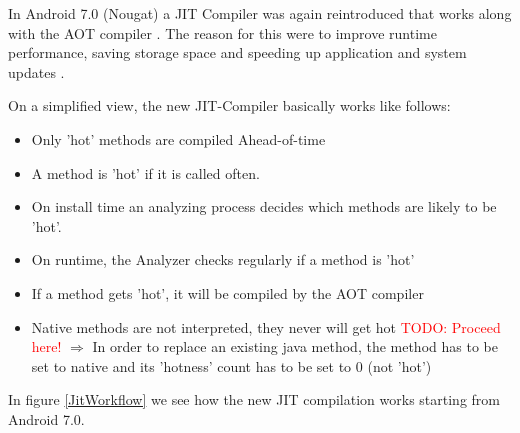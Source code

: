 In Android 7.0 (Nougat) a JIT Compiler was again reintroduced that works along with the AOT compiler \cite{Android7ForDevelopers}. The reason for this were to improve runtime performance, saving storage space and speeding up application and system updates \cite{JitWorkFlow}.

On a simplified view, the new JIT-Compiler basically works like follows:  


\begin{itemize}
    \item Only 'hot' methods are compiled Ahead-of-time 
    \item A method is 'hot' if it is called often.
    \item On install time an analyzing process decides which methods are likely to be 'hot'.
    \item On runtime, the Analyzer checks regularly if a method is 'hot'
    \item If a method gets 'hot', it will be compiled by the AOT compiler
    \item Native methods are not interpreted, they never will get hot \newline
    \textcolor{red}{TODO: Proceed here!}
    $\Rightarrow$ In order to replace an existing java method, the method has to be set to native and its 'hotness' count has to be set to 0 (not 'hot')
    \end{itemize}
    
In figure \ref{JitWorkflow} we see how the new JIT compilation works starting from Android 7.0.     
    
